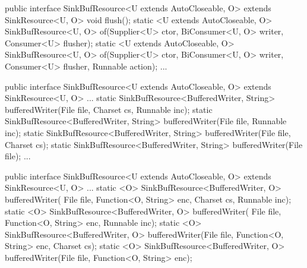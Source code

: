\begin{elisting}[!htb]
\begin{javacode}
public interface SinkBufResource<U extends AutoCloseable, O> extends SinkResource<U, O> {
	void flush();
	static <U extends AutoCloseable, O>
    SinkBufResource<U, O> of(Supplier<U> ctor, BiConsumer<U, O> writer, Consumer<U> flusher);
    static <U extends AutoCloseable, O>
    SinkBufResource<U, O> of(Supplier<U> ctor, BiConsumer<U, O> writer, Consumer<U> flusher, Runnable action);
	...
}
\end{javacode}
\caption{Metodi per creare una risorsa \texttt{SinkBufResource} generica}
\label{lst:snkBufResGen}
\end{elisting}

\begin{elisting}[!htb]
\begin{javacode}
public interface SinkBufResource<U extends AutoCloseable, O> extends SinkResource<U, O> {
	...
    static SinkBufResource<BufferedWriter, String> bufferedWriter(File file, Charset cs, Runnable inc);
    static SinkBufResource<BufferedWriter, String> bufferedWriter(File file, Runnable inc);
    static SinkBufResource<BufferedWriter, String> bufferedWriter(File file, Charset cs);
    static SinkBufResource<BufferedWriter, String> bufferedWriter(File file);
	...
}
\end{javacode}
\caption{Metodi per creare una risorsa \texttt{SinkBufResource<BufferedWriter, String>}}
\label{lst:snkBufResStr}
\end{elisting}

\begin{elisting}[!htb]
\begin{javacode}
public interface SinkBufResource<U extends AutoCloseable, O> extends SinkResource<U, O> {
	...
    static <O> SinkBufResource<BufferedWriter, O> bufferedWriter(
    		File file, Function<O, String> enc, Charset cs, Runnable inc);
    static <O> SinkBufResource<BufferedWriter, O> bufferedWriter(
    		File file, Function<O, String> enc, Runnable inc);
    static <O> SinkBufResource<BufferedWriter, O> bufferedWriter(File file, Function<O, String> enc, Charset cs);
    static <O> SinkBufResource<BufferedWriter, O> bufferedWriter(File file, Function<O, String> enc);
}
\end{javacode}
\caption{Metodi per creare una risorsa \texttt{SinkBufResource<BufferedWriter, O>} con funzione di codifica}
\label{lst:snkBufResFcn}
\end{elisting}

